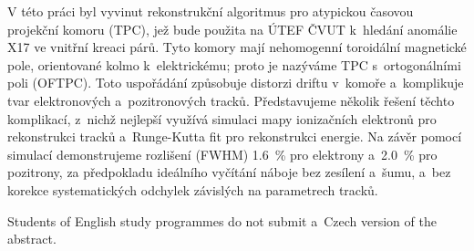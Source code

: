\documentclass[12pt]{report}
\begin{document}
\ifx\StudyLanguage\LangCS

V této práci byl vyvinut rekonstrukční algoritmus pro atypickou časovou projekční komoru (TPC), jež bude použita na ÚTEF ČVUT k~hledání anomálie X17 ve vnitřní kreaci párů. Tyto komory mají nehomogenní toroidální magnetické pole, orientované kolmo k~elektrickému; proto je nazýváme TPC s~ortogonálními poli (OFTPC). Toto uspořádání způsobuje distorzi driftu v~komoře a~komplikuje tvar elektronových a~pozitronových tracků. Představujeme několik řešení těchto komplikací, z~nichž nejlepší využívá simulaci mapy ionizačních elektronů pro rekonstrukci tracků a~Runge-Kutta fit pro rekonstrukci energie. Na závěr pomocí simulací demonstrujeme rozlišení (FWHM) \qty{1.6}{\percent} pro elektrony a~\qty{2.0}{\percent} pro pozitrony, za předpokladu ideálního vyčítání náboje bez zesílení a~šumu, a~bez korekce systematických odchylek závislých na parametrech tracků.

\else

Students of English study programmes do not submit a~Czech version
of the abstract.

\fi
\end{document}
